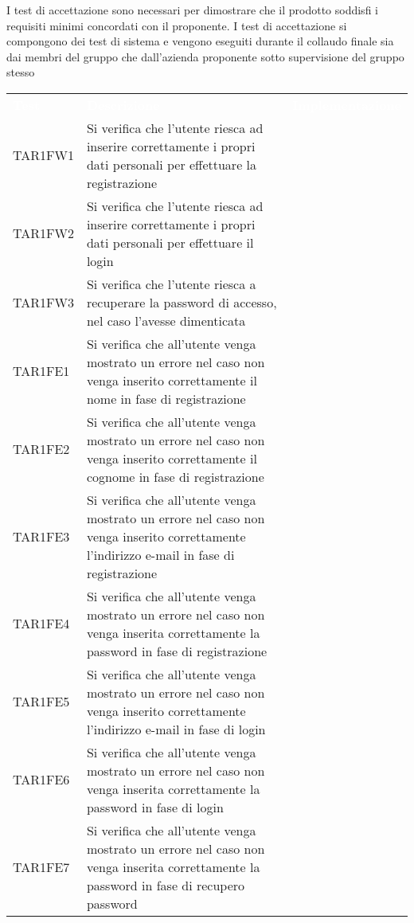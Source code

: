 I test di accettazione sono necessari per dimostrare che il prodotto soddisfi i requisiti
minimi concordati con il proponente.
I test di accettazione si compongono dei test di sistema e vengono eseguiti durante il collaudo
finale sia dai membri del gruppo che dall’azienda proponente sotto supervisione del gruppo
stesso
\renewcommand{\arraystretch}{1.5}
\begin{longtable}{ m{}<{\centering}  m{}<{\centering}  m{}<{\centering} }
	\rowcolor{darkblue}
	\textcolor{white}{\textbf{Test}} &\textcolor{white}{\textbf{Descrizione}} & \textcolor{white}{\textbf{Implementazione}} \\ 

	TAR1FW1 & Si verifica che l'utente riesca ad inserire correttamente i propri dati personali per effettuare la registrazione & \Ni \\
	TAR1FW2 & Si verifica che l'utente riesca ad inserire correttamente i propri dati personali per effettuare il login & \Ni \\
	TAR1FW3 & Si verifica che l'utente riesca a recuperare la password di accesso, nel caso l'avesse dimenticata & \Ni \\
	TAR1FE1 & Si verifica che all'utente venga mostrato un errore nel caso non venga inserito correttamente il nome in fase di registrazione & \Ni \\
	TAR1FE2 & Si verifica che all'utente venga mostrato un errore nel caso non venga inserito correttamente il cognome in fase di registrazione & \Ni \\
	TAR1FE3 & Si verifica che all'utente venga mostrato un errore nel caso non venga inserito correttamente l'indirizzo e-mail in fase di registrazione & \Ni \\
	TAR1FE4 & Si verifica che all'utente venga mostrato un errore nel caso non venga inserita correttamente la password in fase di registrazione & \Ni \\
	TAR1FE5 & Si verifica che all'utente venga mostrato un errore nel caso non venga inserito correttamente l'indirizzo e-mail in fase di login & \Ni \\
	TAR1FE6 & Si verifica che all'utente venga mostrato un errore nel caso non venga inserita correttamente la password in fase di login & \Ni \\
	TAR1FE7 & Si verifica che all'utente venga mostrato un errore nel caso non venga inserita correttamente la password in fase di recupero password & \Ni \\

\end{longtable}

